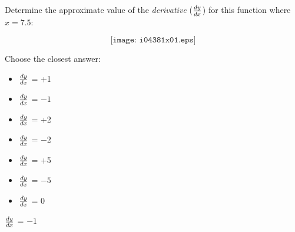 

Determine the approximate value of the {\it derivative} ($dy \over dx$) for this function where $x=7.5$:

$$\texttt{[image: i04381x01.eps]}$$

Choose the closest answer:

\begin{itemize}
\item{} $dy \over dx$ = +1
\vskip 10pt 
\item{} $dy \over dx$ = $-1$
\vskip 10pt 
\item{} $dy \over dx$ = +2
\vskip 10pt 
\item{} $dy \over dx$ = $-2$
\vskip 10pt 
\item{} $dy \over dx$ = +5
\vskip 10pt 
\item{} $dy \over dx$ = $-5$
\vskip 10pt 
\item{} $dy \over dx$ = 0
\end{itemize}







$dy \over dx$ = $-1$











